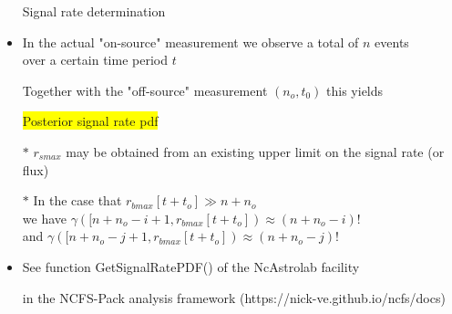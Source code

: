 \Tr
\begin{itemize}
\item[] \begin{center}{\red Signal rate determination}\end{center}
\item In the actual "on-source" measurement we observe a total of $n$ events\\
      over a certain time period $t$
\item[] Together with the "off-source" measurement $(n_{o},t_{0})$ this yields
\item[] \begin{center}
        \colorbox{yellow}{Posterior signal rate pdf}\\[1mm]
      {\blue {}}
        \end{center}
\item[$\ast$] $r_{smax}$ may be obtained from an existing upper limit on the signal rate (or flux)
\item[$\ast$] In the case that $r_{bmax}[t+t_{o}] \gg n+n_{o}$\\
      we have $\gamma([n+n_{o}-i+1,r_{bmax}[t+t_{o}]) \approx (n+n_{o}-i)!$\\
      and $\gamma([n+n_{o}-j+1,r_{bmax}[t+t_{o}]) \approx (n+n_{o}-j)!$
\item {\blue See function GetSignalRatePDF() of the NcAstrolab facility}
\item[] {\blue in the NCFS-Pack analysis framework (https://nick-ve.github.io/ncfs/docs)}
\end{itemize}

